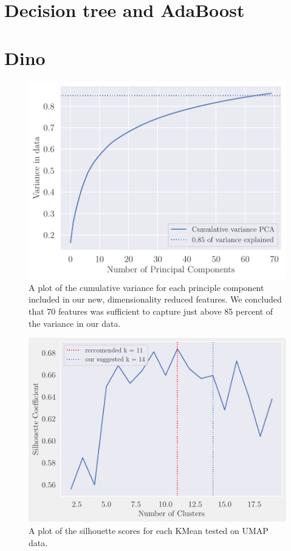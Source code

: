 \section{Decision tree and AdaBoost}\label{ap:decision_adaboost}


\section{Dino}\label{ap:dino}
\begin{figure}[H]
    \centering
    \includegraphics[width=0.9\linewidth]{examples/tests_eb/figs/cumsum_pca.pdf}
    \caption{A plot of the cumulative variance for each principle component included in our new, dimensionality reduced features. We concluded that 70 features was sufficient to capture just above 85 percent of the variance in our data.}
    \label{fig:cumsumpca}
\end{figure}

\begin{figure}[H]
    \centering
    \includegraphics[width=0.9\linewidth]{examples/tests_eb/figs/kmean_sil.pdf}
    \caption{A plot of the silhouette scores for each KMean tested on UMAP data.}
    \label{fig_cumsumpca}
\end{figure}


